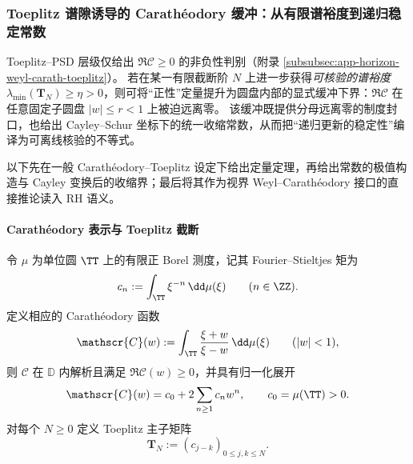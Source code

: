 \subsubsection{Toeplitz 谱隙诱导的 Carath\'eodory 缓冲：从有限谱裕度到递归稳定常数}\label{subsubsec:cdim-toeplitz-spectral-gap-buffer}
Toeplitz--PSD 层级仅给出 \(\Re\mathscr{C}\ge 0\) 的非负性判别（附录 \ref{subsubsec:app-horizon-weyl-carath-toeplitz}）。
若在某一有限截断阶 \(N\) 上进一步获得\emph{可核验的谱裕度} \(\lambda_{\min}(\mathbf{T}_N)\ge \eta>0\)，则可将“正性”定量提升为圆盘内部的显式缓冲下界：\(\Re\mathscr{C}\) 在任意固定子圆盘 \(|w|\le r<1\) 上被迫远离零。
该缓冲既提供分母远离零的制度封口，也给出 Cayley--Schur 坐标下的统一收缩常数，从而把“递归更新的稳定性”编译为可离线核验的不等式。
\par
以下先在一般 Carath\'eodory--Toeplitz 设定下给出定量定理，再给出常数的极值构造与 Cayley 变换后的收缩界；最后将其作为视界 Weyl--Carath\'eodory 接口的直接推论读入 RH 语义。
\vspace{4pt}

\paragraph{Carath\'eodory 表示与 Toeplitz 截断}
令 \(\mu\) 为单位圆 \(\TT\) 上的有限正 Borel 测度，记其 Fourier--Stieltjes 矩为
\[
c_n:=\int_{\TT}\xi^{-n}\,\dd\mu(\xi)\qquad(n\in\ZZ).
\]
定义相应的 Carath\'eodory 函数
\begin{equation}\label{eq:cdim-carath-measure-representation}
\mathscr{C}(w):=\int_{\TT}\frac{\xi+w}{\xi-w}\,\dd\mu(\xi)\qquad(|w|<1),
\end{equation}
则 \(\mathscr{C}\) 在 \(\mathbb{D}\) 内解析且满足 \(\Re \mathscr{C}(w)\ge 0\)，并具有归一化展开
\begin{equation}\label{eq:cdim-carath-series}
\mathscr{C}(w)=c_0+2\sum_{n\ge 1}c_n w^n,\qquad c_0=\mu(\TT)>0.
\end{equation}
对每个 \(N\ge 0\) 定义 Toeplitz 主子矩阵
\[
\mathbf{T}_N:=(c_{j-k})_{0\le j,k\le N}.
\]

